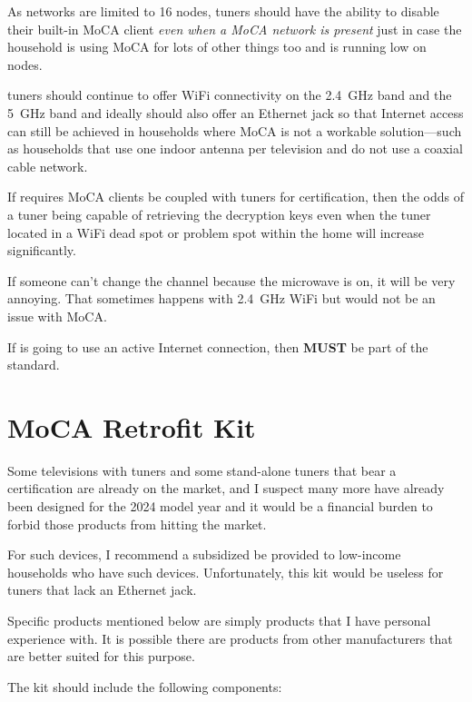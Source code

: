 As  networks are limited to 16 nodes,  tuners should have the ability to
disable their built-in MoCA client \emph{even when a MoCA network is present} just in case
the household is using MoCA for lots of other things too and is running low on nodes.

\ngtv{} tuners should continue to offer WiFi connectivity on the \qty{2.4}{\giga\hertz} band
and the \qty{5}{\giga\hertz} band and ideally should also offer an Ethernet jack so that
Internet access can still be achieved in households where MoCA is not a workable solution---such
as households that use one indoor antenna per television and do not use a coaxial cable network.

If \ngtv{} requires MoCA clients be coupled with  tuners for certification, then the
odds of a tuner being capable of retrieving the decryption keys even when the tuner located in
a WiFi dead spot or problem spot within the home will increase significantly.

If someone can't change the channel because the microwave is on, it will be very annoying. That
sometimes happens with \qty{2.4}{\giga\hertz} WiFi but would not be an issue with MoCA.

If \ngtv{} is going to use an active Internet connection, then \xdband{} \textbf{MUST} be part
of the \ngtv{} standard.


\section{MoCA Retrofit Kit}

Some televisions with  tuners and some stand-alone  tuners that bear
a \ngtv{} certification are already on the market, and I suspect many more have
already been designed for the 2024 model year and it would be a financial burden to
forbid those products from hitting the market.

For such devices, I recommend a subsidized  be provided to
low-income households who have such devices. Unfortunately, this kit would be
useless for  tuners that lack an Ethernet jack.

Specific products mentioned below are simply products that I have personal experience with.
It is possible there are products from other manufacturers that are better suited for this
purpose.

The kit should include the following components:

